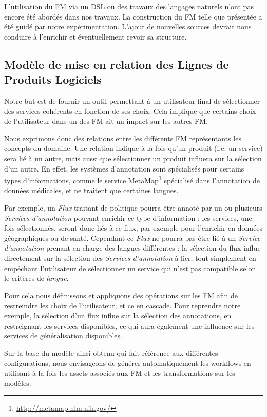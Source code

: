 \documentclass[]{ciel}
\begin{document}
L'utilisation du FM via un DSL ou des travaux des langages naturels n'ont pas encore été abordés dans nos travaux.
La construction du FM telle que présentée a été guidé par notre expérimentation. L'ajout de nouvelles sources devrait nous conduire à l'enrichir et éventuellement revoir sa structure.

\subsection{Modèle de mise en relation des Lignes de Produits Logiciels}
Notre but est de fournir un outil permettant à un utilisateur final de sélectionner des services cohérents en fonction de ses choix. Cela implique que certains choix de l'utilisateur dans un des FM ait un impact sur les autres FM.

Nous exprimons donc des relations entre les différents FM représentants les concepts du domaine. Une relation indique à la fois qu'un produit (i.e. un service) sera lié à un autre, mais aussi que sélectionner un produit influera sur la sélection d'un autre. En effet, les systèmes d'annotation sont spécialisés pour certains types d'informations, comme le service MetaMap\footnote{\url{http://metamap.nlm.nih.gov/}} spécialisé dans l'annotation de données médicales, et ne traitent que certaines langues.

Par exemple, un \textit{Flux} traitant de politique pourra être annoté par un ou plusieurs \textit{Services d'annotation} pouvant enrichir ce type d'information : les services, une fois sélectionnés, seront donc liés à ce flux, par exemple pour l'enrichir en données géographiques ou de santé. Cependant ce \textit{Flux} ne pourra pas être lié à un \textit{Service d'annotation} prenant en charge des langues différentes : la sélection du flux influe directement sur la sélection des \textit{Services d'annotation} à lier, tout simplement en empêchant l'utilisateur de sélectionner un service qui n'est pas compatible selon le critères de \textit{langue}.

Pour cela nous définissons et appliquons des opérations sur les FM \cite{Acher2011} afin de restreindre les choix de l'utilisateur, et ce en cascade. Pour reprendre notre exemple, la sélection d'un flux influe sur la sélection des annotations, en restreignant les services disponibles, ce qui aura également une influence sur les services de généralisation disponibles.

Sur la base du modèle ainsi obtenu qui fait référence aux différentes configurations, nous envisageons de générer automatiquement les workflows en utilisant à la fois les assets associés aux FM et les transformations sur les modèles.
\end{document}
